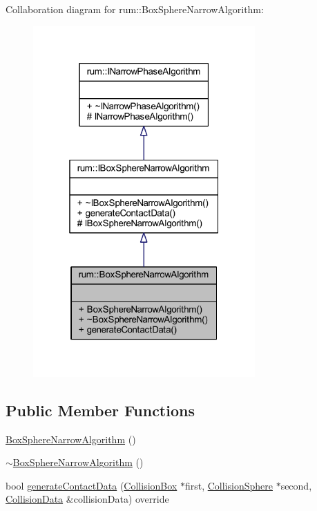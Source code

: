 Collaboration diagram for rum\+:\+:Box\+Sphere\+Narrow\+Algorithm\+:\nopagebreak
\begin{figure}[H]
\begin{center}
\leavevmode
\includegraphics[width=241pt]{classrum_1_1_box_sphere_narrow_algorithm__coll__graph}
\end{center}
\end{figure}
\subsection*{Public Member Functions}
\begin{DoxyCompactItemize}
\item 
\mbox{\hyperlink{classrum_1_1_box_sphere_narrow_algorithm_a93aa9298ac1bb18434abbc5cce8f29d4}{Box\+Sphere\+Narrow\+Algorithm}} ()
\item 
\mbox{\hyperlink{classrum_1_1_box_sphere_narrow_algorithm_a34a248984dd5a75fff178712ee67335e}{$\sim$\+Box\+Sphere\+Narrow\+Algorithm}} ()
\item 
bool \mbox{\hyperlink{classrum_1_1_box_sphere_narrow_algorithm_aabb8b78607bf604fa7455da4a908c794}{generate\+Contact\+Data}} (\mbox{\hyperlink{classrum_1_1_collision_box}{Collision\+Box}} $\ast$first, \mbox{\hyperlink{classrum_1_1_collision_sphere}{Collision\+Sphere}} $\ast$second, \mbox{\hyperlink{classrum_1_1_collision_data}{Collision\+Data}} \&collision\+Data) override
\end{DoxyCompactItemize}
